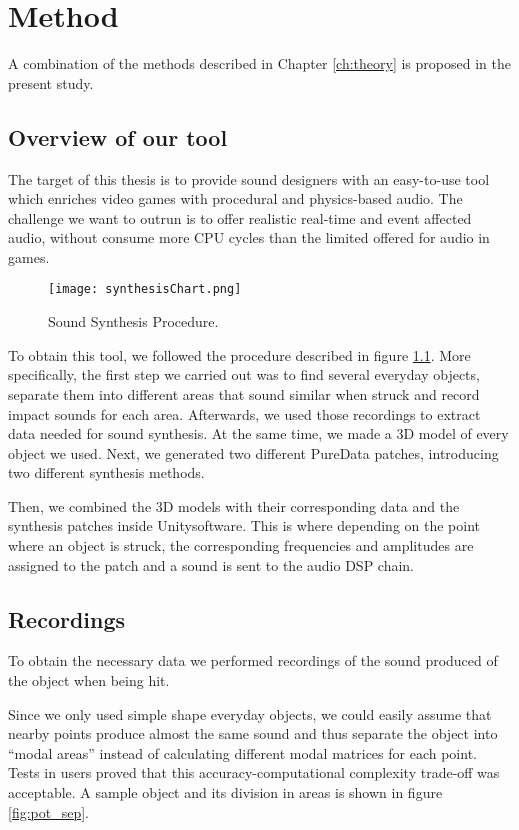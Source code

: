 \chapter{Method}\label{ch:method}

A combination of the methods described in Chapter \ref{ch:theory} is proposed in the present study.

\section{Overview of our tool}
The target of this thesis is to provide sound designers with an easy-to-use tool which enriches video games with procedural and physics-based audio. The challenge we want to outrun is to offer realistic real-time and event affected audio, without consume more CPU cycles than the limited offered for audio in games.

\begin{figure}[H]
  \centering
    \texttt{[image: synthesisChart.png]}
      \caption{Sound Synthesis Procedure.}
      \label{fig:synth_proc}
\end{figure}

To obtain this tool, we followed the procedure described in figure \ref{fig:synth_proc}. More specifically, the first step we carried out was to find several everyday objects, separate them into different areas that sound similar when struck and record impact sounds for each area. Afterwards, we used those recordings to extract data needed for sound synthesis. At the same time, we made a 3D model of every object we used. Next, we generated two different PureData patches, introducing two different synthesis methods. 

Then, we combined the 3D models with their corresponding data and the synthesis patches inside Unity\textregistered software. This is where depending on the point where an object is struck, the corresponding frequencies and amplitudes are assigned to the patch and a sound is sent to the audio DSP chain.

\section{Recordings}
To obtain the necessary data we performed recordings of the sound produced of the object when being hit. 

Since we only used simple shape everyday objects, we could easily assume that nearby points produce almost the same sound and thus separate the object into ``modal areas'' instead of calculating different modal matrices for each point. Tests in users proved that this accuracy-computational complexity trade-off was acceptable. A sample object and its division in areas is shown in figure \ref{fig:pot_sep}.

